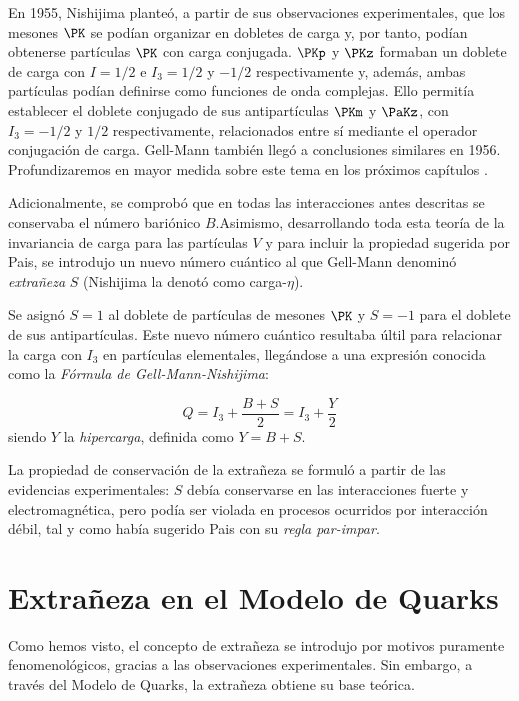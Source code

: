 En 1955, Nishijima planteó, a partir de sus observaciones experimentales, que los mesones $\PK$ se podían organizar en dobletes de carga y, por tanto, podían obtenerse partículas $\PK$ con carga conjugada. $\PKp$ y $\PKz$ formaban un doblete de carga con $I=1/2$ e $I_3=1/2$ y $-1/2$ respectivamente y, además, ambas partículas podían definirse como funciones de onda complejas. Ello permitía establecer el doblete conjugado de sus antipartículas $\PKm$ y $\PaKz$, con $I_3=-1/2$ y $1/2$ respectivamente, relacionados entre sí mediante el operador conjugación de carga. Gell-Mann también llegó a conclusiones similares en 1956. Profundizaremos en mayor medida sobre este tema en los próximos capítulos \cite{Nishijima1955}.

Adicionalmente, se comprobó que en todas las interacciones antes descritas se conservaba el número bariónico $B$.\protect\footnotemark Asimismo, desarrollando toda esta teoría de la invariancia de carga para las partículas $V$ y para incluir la propiedad sugerida por Pais, se introdujo un nuevo número cuántico al que Gell-Mann denominó \textit{extrañeza} $S$ (Nishijima la denotó como carga-$\eta$).


Se asignó $S=1$ al doblete de partículas de mesones $\PK$ y $S=-1$ para el doblete de sus antipartículas. Este nuevo número cuántico resultaba últil para relacionar la carga con $I_3$ en partículas elementales, llegándose a una expresión conocida como la \textit{Fórmula de Gell-Mann-Nishijima}:

\begin{equation}
Q=I_3+ \frac{B+S}{2}=I_3+\frac{Y}{2}
\end{equation}
siendo $Y$ la \textit{hipercarga}, definida como $Y=B+S$.

La propiedad de conservación de la extrañeza se formuló a partir de las evidencias experimentales: $S$ debía conservarse en las interacciones fuerte y electromagnética, pero podía ser violada en procesos ocurridos por interacción débil, tal y como había sugerido Pais con su \textit{regla par-impar}.\\


\section{Extrañeza en el Modelo de Quarks}\label{cap:strangeness_quark_model}
Como hemos visto, el concepto de extrañeza se introdujo por motivos puramente fenomenológicos, gracias a las observaciones experimentales. Sin embargo, a través del Modelo de Quarks, la extrañeza obtiene su base teórica.

